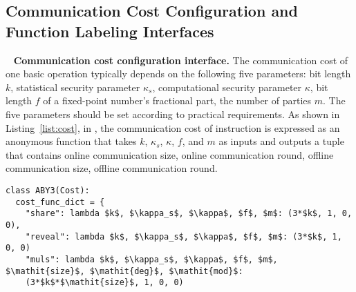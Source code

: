 \subsection{Communication Cost Configuration and Function Labeling Interfaces }~\label{subsec:label_interface}
\noindent \textbf{Communication cost configuration interface.} 
The communication cost of one basic operation typically depends on the following five parameters: bit length $k$, statistical security parameter $\kappa_s$, computational security parameter $\kappa$, bit length $f$ of a fixed-point number's fractional part, the number of parties $m$. The five parameters should be set according to practical requirements. As shown in Listing~\ref{list:cost}, in \hawkeye, the communication cost of instruction is expressed as an anonymous function that takes $k$, $\kappa_s$, $\kappa$, $f$, and $m$ as inputs and outputs a tuple that contains online communication size, online communication round, offline communication size, offline communication round. 
\begin{lstlisting}[mathescape,xleftmargin=2em,framexleftmargin=2em, caption = {Communication cost configuration for part of basic operations of $\texttt{ABY3}$~\cite{mohassel2018aby3} framework. One basic operation corresponds to one basic instruction in cost\_function\_dict}, columns=fullflexible, label = {list:cost}]
class ABY3(Cost):
  cost_func_dict = {
    "share": lambda $k$, $\kappa_s$, $\kappa$, $f$, $m$: (3*$k$, 1, 0, 0),
    "reveal": lambda $k$, $\kappa_s$, $\kappa$, $f$, $m$: (3*$k$, 1, 0, 0)
    "muls": lambda $k$, $\kappa_s$, $\kappa$, $f$, $m$, $\mathit{size}$, $\mathit{deg}$, $\mathit{mod}$: 
    (3*$k$*$\mathit{size}$, 1, 0, 0)
\end{lstlisting}


